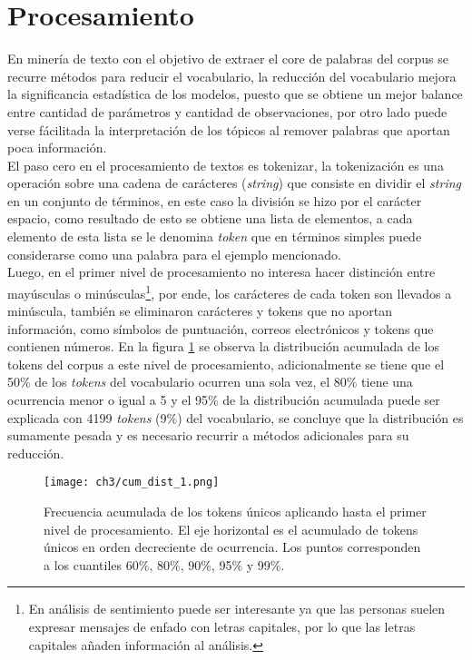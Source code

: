 \documentclass[letterpaper,12pt,oneside]{book} %
\begin{document}
\section{Procesamiento}

En minería de texto con el objetivo de extraer el core de palabras del corpus se recurre métodos para reducir el vocabulario, la reducción del vocabulario mejora la significancia estadística de los modelos, puesto que se obtiene un mejor balance entre cantidad de parámetros y cantidad de observaciones, por otro lado puede verse fácilitada la interpretación de los tópicos al remover palabras que aportan poca información. \\

El paso cero en el procesamiento de textos es tokenizar, la tokenización es una operación sobre una cadena de carácteres (\textit{string}) que consiste en dividir el \textit{string} en un conjunto de términos, en este caso la división se hizo por el carácter espacio, como resultado de esto se obtiene una lista de elementos, a cada elemento de esta lista se le denomina \textit{token} que en términos simples puede considerarse como una palabra para el ejemplo mencionado. \\

Luego, en el primer nivel de procesamiento no interesa hacer distinción entre mayúsculas o minúsculas\footnote{En análisis de sentimiento puede ser interesante ya que las personas suelen expresar mensajes de enfado con letras capitales, por lo que las letras capitales añaden información al análisis.}, por ende, los carácteres de cada token son llevados a minúscula, también se eliminaron carácteres y tokens que no aportan información, como símbolos de puntuación, correos electrónicos y tokens que contienen números. En la figura \ref{img:cum_dist1} se observa la distribución acumulada de los tokens del corpus a este nivel de procesamiento, adicionalmente se tiene que el 50\% de los \textit{tokens} del vocabulario ocurren una sola vez, el 80\% tiene una ocurrencia menor o igual a 5 y el 95\% de la distribución acumulada puede ser explicada con 4199 \textit{tokens} (9\%) del vocabulario, se concluye que la distribución es sumamente pesada y es necesario recurrir a métodos adicionales para su reducción.\\

\begin{figure}
    \centering
    \texttt{[image: ch3/cum\_dist\_1.png]}
    \caption{Frecuencia acumulada de los tokens únicos aplicando hasta el primer nivel de procesamiento. El eje horizontal es el acumulado de tokens únicos en orden decreciente de ocurrencia. Los puntos corresponden a los cuantiles 60\%, 80\%, 90\%, 95\% y 99\%.}
    \label{img:cum_dist1}
\end{figure}
\end{document}
